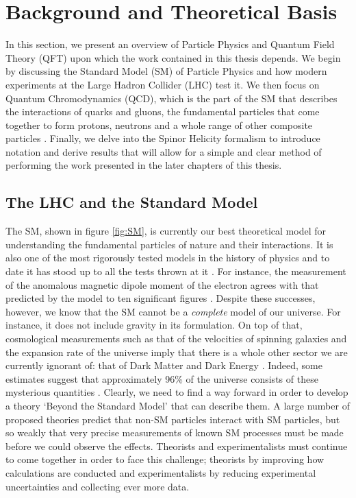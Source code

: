 \chapter{Background and Theoretical Basis}

In this section, we present an overview of Particle Physics and Quantum Field Theory (QFT) upon which the work contained in this thesis depends. We begin by discussing the Standard Model (SM) of Particle Physics and how modern experiments at the Large Hadron Collider (LHC) test it. We then focus on Quantum Chromodynamics (QCD), which is the part of the SM that describes the interactions of quarks and gluons, the fundamental particles that come together to form protons, neutrons and a whole range of other composite particles \cite{PDG}. Finally, we delve into the Spinor Helicity formalism \cite{Elvang2013} to introduce notation and derive results that will allow for a simple and clear method of performing the work presented in the later chapters of this thesis. 

\section{The LHC and the Standard Model}

The SM, shown in figure \ref{fig:SM}, is currently our best theoretical model for understanding the fundamental particles of nature and their interactions. It is also one of the most rigorously tested models in the history of physics and to date it has stood up to all the tests thrown at it \cite{Ellis1995}. For instance, the measurement of the anomalous magnetic dipole moment of the electron agrees with that predicted by the model to ten significant figures \cite{Aoyama2012}. Despite these successes, however, we know that the SM cannot be a \emph{complete} model of our universe. For instance, it does not include gravity in its formulation. On top of that, cosmological measurements such as that of the velocities of spinning galaxies and the expansion rate of the universe imply that there is a whole other sector we are currently ignorant of: that of Dark Matter and Dark Energy \cite{Bertone2005}. Indeed, some estimates suggest that approximately 96\% of the universe consists of these mysterious quantities \cite{Jarosik2011}. Clearly, we need to find a way forward in order to develop a theory `Beyond the Standard Model' that can describe them. A large number of proposed theories predict that non-SM particles interact with SM particles, but so weakly that very precise measurements of known SM processes must be made before we could observe the effects. Theorists and experimentalists must continue to come together in order to face this challenge; theorists by improving how calculations are conducted and experimentalists by reducing experimental uncertainties and collecting ever more data. 

